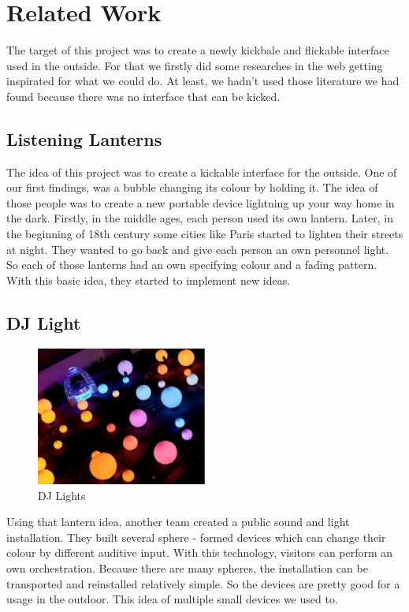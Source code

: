 \section{Related Work}
The target of this project was to create a newly kickbale and flickable interface used in the outside. For that we firstly did some researches in the web getting inspirated for what we could do.
At least, we hadn't used those literature we had found because there was no interface that can be kicked.
 
\subsection{Listening Lanterns}
The idea of this project was to create a kickable interface for the outside. One of our first findings, was a bubble changing its colour by holding it. The idea of those people was to create a new portable device lightning up your way home in the dark. Firstly, in the middle ages, each person used its own lantern. Later, in the beginning of 18th century some cities like Paris started to lighten their streets at night. They wanted to go back and give each person an own personnel light. So each of those lanterns had an own specifying colour and a fading pattern.\newline
With this basic idea, they started to implement new ideas. \newline

\subsection{DJ Light}

\begin{figure}[h!]
	\centering
	\includegraphics[width=0.5\textwidth, clip=true, keepaspectratio=true]{./pic/dj_light.png}
	\caption{DJ Lights}
	\label{fig:DJ_Lights}
\end{figure}

Using that lantern idea, another team created a public sound and light installation.\newline
They built several sphere - formed devices which can change their colour by different auditive input. With this technology, visitors can perform an own orchestration. Because there are many spheres, the installation can be transported and reinstalled relatively simple. So the devices are pretty good for a usage in the outdoor.\newline
This idea of multiple small devices we used to. \newline

